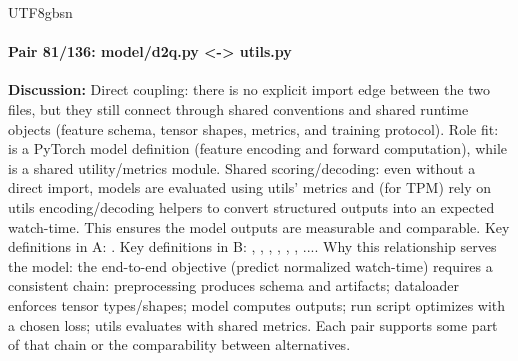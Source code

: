 \documentclass[11pt]{article}
\begin{document}
\begin{CJK*}{UTF8}{gbsn}
\paragraph{Pair 81/136: model/d2q.py <-> utils.py}
\textbf{Discussion:} Direct coupling: there is no explicit import edge between the two files, but they still connect through shared conventions and shared runtime objects (feature schema, tensor shapes, metrics, and training protocol). Role fit: \texttt{} is a PyTorch model definition (feature encoding and forward computation), while \texttt{} is a shared utility/metrics module. Shared scoring/decoding: even without a direct import, models are evaluated using utils' metrics and (for TPM) rely on utils encoding/decoding helpers to convert structured outputs into an expected watch-time. This ensures the model outputs are measurable and comparable. Key definitions in A: \texttt{}. Key definitions in B: \texttt{}, \texttt{}, \texttt{}, \texttt{}, \texttt{}, \texttt{}, .... Why this relationship serves the model: the end-to-end objective (predict normalized watch-time) requires a consistent chain: preprocessing produces schema and artifacts; dataloader enforces tensor types/shapes; model computes outputs; run script optimizes with a chosen loss; utils evaluates with shared metrics. Each pair supports some part of that chain or the comparability between alternatives.


\end{CJK*}
\end{document}
